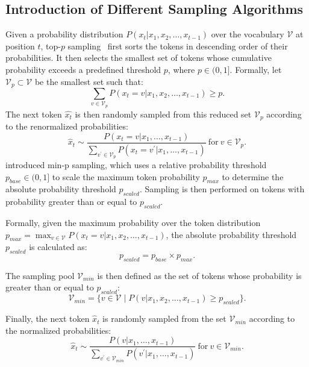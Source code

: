 \subsection{Introduction of Different Sampling Algorithms}
Given a probability distribution $P(x_t | x_1, x_2, \ldots, x_{t-1})$ over the vocabulary $\mathcal{V}$ at position $t$, top-$p$ sampling~\citep{topp} first sorts the tokens in descending order of their probabilities. It then selects the smallest set of tokens whose cumulative probability exceeds a predefined threshold $p$, where $p \in (0, 1]$. Formally, let $\mathcal{V}_p \subset \mathcal{V}$ be the smallest set such that:
\begin{equation}
    \nonumber
    \sum_{v\in\mathcal{V}_p}P(x_t=v|x_1,x_2,\ldots,x_{t-1})\geq p.
\end{equation}
The next token $\hat{x_t}$ is then randomly sampled from this reduced set $\mathcal{V}_p$ according to the renormalized probabilities:
\begin{equation}
\nonumber
    \hat{x}_t\sim\frac{P(x_t=v|x_1,\ldots,x_{t-1})}{\sum_{v^{\prime}\in\mathcal{V}_p}P(x_t=v^{\prime}|x_1,\ldots,x_{t-1})}\mathrm{~for~}v\in\mathcal{V}_p.
\end{equation}
\citet{minp} introduced min-p sampling, which uses a relative probability threshold $p_{base} \in (0, 1]$ to scale the maximum token probability $p_{max}$ to determine the absolute probability threshold $p_{scaled}$. Sampling is then performed on tokens with probability greater than or equal to $p_{scaled}$.

Formally, given the maximum probability over the token distribution $p_{max} = \max_{v\in\mathcal{V}} P(x_t=v|x_1,x_2,\ldots,x_{t-1})$, the absolute probability threshold $p_{scaled}$ is calculated as:
\begin{equation}
\nonumber
    p_{scaled} = p_{base} \times p_{max}.
\end{equation}

The sampling pool $\mathcal{V}_{min}$ is then defined as the set of tokens whose probability is greater than or equal to $p_{scaled}$:
\begin{equation}
\nonumber
    \mathcal{V}_{min}=\{v\in\mathcal{V}\mid P(v|x_1,x_2,\ldots,x_{t-1})\geq p_{scaled}\}.
\end{equation}

Finally, the next token $\hat {x}_t$ is randomly sampled from the set $\mathcal{V}_{min}$ according to the normalized probabilities:
\begin{equation}
\nonumber
    \hat{x}_t\sim\frac{P(v|x_1,\ldots,x_{t-1})}{\sum_{v^{\prime}\in\mathcal{V}_{min}}P(v^{\prime}|x_1,\ldots,x_{t-1})}\mathrm{~for~}v\in\mathcal{V}_{min}.
\end{equation}

